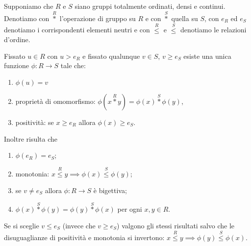 \begin{theorem}%
  \label{th:isomorfismo}%
  Supponiamo che $R$ e $S$ siano gruppi totalmente ordinati, densi e continui.
  Denotiamo con $\stackrel R*$ l'operazione di gruppo su $R$ 
  e con $\stackrel S*$ quella su $S$, con $e_R$ ed $e_S$ denotiamo i corrispondenti 
  elementi neutri e con $\stackrel R\le$ e $\stackrel S\le$ 
  denotiamo le relazioni d'ordine.

  Fissato $u\in R$ con $u > e_R$ e fissato qualunque $v \in S$,
  $v \ge e_S$ esiste una unica funzione $\phi\colon R\to S$
  tale che:
  \begin{enumerate}
    \item $\phi(u)=v$
    \item proprietà di omomorfismo: 
    $\phi(x \stackrel R* y) = \phi(x) \stackrel S* \phi(y)$,
    \item positività:
    se $x\ge e_R$ allora $\phi(x) \ge e_S$. 
  \end{enumerate}
  Inoltre risulta che 
  \begin{enumerate}
    \item $\phi(e_R)=e_S$;
    \item monotonia: 
    $x\stackrel R\le y \implies \phi(x) \stackrel S\le \phi(y)$;
    \item se $v\neq e_S$ allora $\phi\colon R\to S$ è bigettiva;
    \item $\phi(x) \stackrel S* \phi(y) = \phi(y)\stackrel S*\phi(x)$ 
    per ogni $x,y\in R$.
  \end{enumerate}

  Se si sceglie $v\le e_S$ (invece che $v\ge e_S$) 
  valgono gli stessi risultati salvo 
  che le disuguaglianze di positività e monotonia si invertono:
  $x\stackrel R\le y \implies \phi(y) \stackrel S\le \phi(x)$.
\end{theorem}
    
